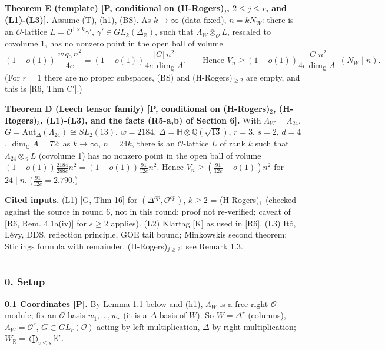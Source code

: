 \textbf{Theorem E (template) {[}P, conditional on (H-Rogers)\(_j\), \(2\le j\le r\), and (L1)-(L3){]}.} Assume (T), (h1), (BS). As \(k\to\infty\) (data fixed), \(n=kN_W\): there is an \(\mathcal O\)-lattice \(L=\mathcal O^{1\times k}\gamma'\), \(\gamma'\in GL_k(\Delta_{\mathbb R})\), such that \(\Lambda_W\otimes_{\mathcal O}L\), rescaled to covolume 1, has no nonzero point in the open ball of volume
\[(1-o(1))\,\frac{w\,q_0\,n^2}{4e}=(1-o(1))\frac{|G|\,n^2}{4e\,\dim_{\mathbb Q}A}.\qquad\text{Hence }V_n\ge(1-o(1))\frac{|G|n^2}{4e\dim_{\mathbb Q}A}\ \ (N_W\mid n).\]
(For \(r=1\) there are no proper subspaces, (BS) and (H-Rogers)\(_{\ge2}\) are empty, and this is {[}R6, Thm C′{]}.)

\textbf{Theorem D (Leech tensor family) {[}P, conditional on (H-Rogers)\(_2\), (H-Rogers)\(_3\), (L1)-(L3), and the facts (R5-a,b) of Section 6{]}.} With \(\Lambda_W=\Lambda_{24}\), \(G=\mathrm{Aut}_\Delta(\Lambda_{24})\cong SL_2(13)\), \(w=2184\), \(\Delta=\mathbb H\otimes\mathbb Q(\sqrt{13})\), \(r=3\), \(s=2\), \(d=4\), \(\dim_{\mathbb Q}A=72\): as \(k\to\infty\), \(n=24k\), there is an \(\mathcal O\)-lattice \(L\) of rank \(k\) such that \(\Lambda_{24}\otimes_{\mathcal O}L\) (covolume 1) has no nonzero point in the open ball of volume \((1-o(1))\frac{2184}{288e}n^2=(1-o(1))\frac{91}{12e}n^2\). Hence \(V_n\ge(\frac{91}{12e}-o(1))n^2\) for \(24\mid n\). (\(\frac{91}{12e}=2.790\).)

\textbf{Cited inputs.} (L1) {[}G, Thm 16{]} for \((\Delta^{op},\mathcal O^{op})\), \(k\ge2\) = (H-Rogers)\(_1\) (checked against the source in round 6, not in this round; proof not re-verified; caveat of {[}R6, Rem. 4.1a(iv){]} for \(s\ge2\) applies). (L2) Klartag {[}K{]} as used in {[}R6{]}. (L3) Itô, Lévy, DDS, reflection principle, GOE tail bound; Minkowski\textquotesingle s second theorem; Stirling\textquotesingle s formula with remainder. (H-Rogers)\(_{j\ge2}\): see Remark 1.3.

\begin{center}\rule{0.5\linewidth}{0.5pt}\end{center}

\hypertarget{setup}{%
\subsubsection*{0. Setup}\label{setup}}

\textbf{0.1 Coordinates {[}P{]}.} By Lemma 1.1 below and (h1), \(\Lambda_W\) is a free right \(\mathcal O\)-module; fix an \(\mathcal O\)-basis \(w_1,\dots,w_r\) (it is a \(\Delta\)-basis of \(W\)). So \(W=\Delta^r\) (columns), \(\Lambda_W=\mathcal O^r\), \(G\subset GL_r(\mathcal O)\) acting by left multiplication, \(\Delta\) by right multiplication; \(W_{\mathbb R}=\bigoplus_{v\le s}\mathbb K^r\).

